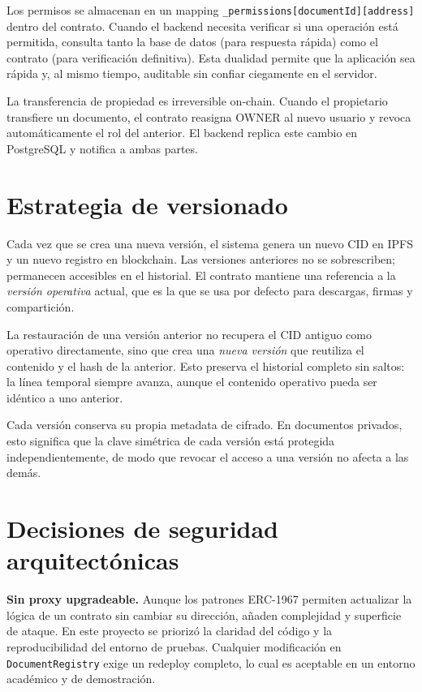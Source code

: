 \documentclass[11pt, a4paper]{article}
\begin{document}
Los permisos se almacenan en un mapping \texttt{\_permissions[documentId][address]} dentro del contrato. Cuando el backend necesita verificar si una operaci\'on est\'a permitida, consulta tanto la base de datos (para respuesta r\'apida) como el contrato (para verificaci\'on definitiva). Esta dualidad permite que la aplicaci\'on sea r\'apida y, al mismo tiempo, auditable sin confiar ciegamente en el servidor.

La transferencia de propiedad es irreversible on-chain. Cuando el propietario transfiere un documento, el contrato reasigna OWNER al nuevo usuario y revoca autom\'aticamente el rol del anterior. El backend replica este cambio en PostgreSQL y notifica a ambas partes.

\section{Estrategia de versionado}

Cada vez que se crea una nueva versi\'on, el sistema genera un nuevo CID en IPFS y un nuevo registro en blockchain. Las versiones anteriores no se sobrescriben; permanecen accesibles en el historial. El contrato mantiene una referencia a la \textit{versi\'on operativa} actual, que es la que se usa por defecto para descargas, firmas y compartici\'on.

La restauraci\'on de una versi\'on anterior no recupera el CID antiguo como operativo directamente, sino que crea una \textit{nueva versi\'on} que reutiliza el contenido y el hash de la anterior. Esto preserva el historial completo sin saltos: la l\'inea temporal siempre avanza, aunque el contenido operativo pueda ser id\'entico a uno anterior.

Cada versi\'on conserva su propia metadata de cifrado. En documentos privados, esto significa que la clave sim\'etrica de cada versi\'on est\'a protegida independientemente, de modo que revocar el acceso a una versi\'on no afecta a las dem\'as.

\section{Decisiones de seguridad arquitect\'onicas}

\textbf{Sin proxy upgradeable.} Aunque los patrones ERC-1967 permiten actualizar la l\'ogica de un contrato sin cambiar su direcci\'on, a\~naden complejidad y superficie de ataque. En este proyecto se prioriz\'o la claridad del c\'odigo y la reproducibilidad del entorno de pruebas. Cualquier modificaci\'on en \texttt{DocumentRegistry} exige un redeploy completo, lo cual es aceptable en un entorno acad\'emico y de demostraci\'on.
\end{document}
